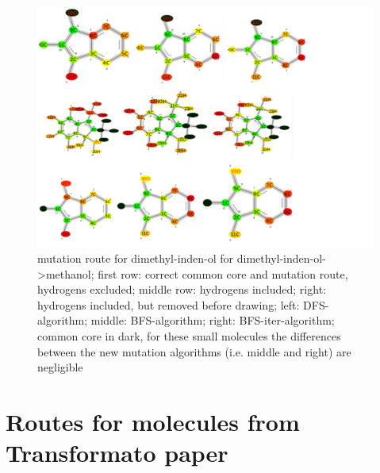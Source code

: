 \begin{figure}[H]
	
	\includegraphics[scale=0.75]{dimethylindenol_set2}\caption{mutation route for dimethyl-inden-ol for dimethyl-inden-ol->methanol; first row: correct common core and mutation route, hydrogens excluded; middle row: hydrogens included; right: hydrogens included, but removed before drawing; left: DFS-algorithm; middle: BFS-algorithm; right: BFS-iter-algorithm; common core in dark, for these small molecules the differences between the new mutation algorithms (i.e. middle and right) are negligible}
	
\end{figure}

\section{Routes for molecules from Transformato paper}

